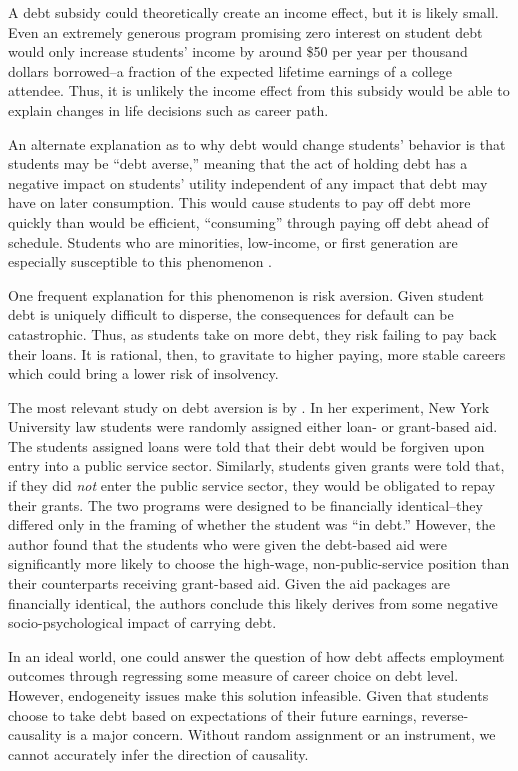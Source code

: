 \documentclass[12pt]{article}
\begin{document}
	A debt subsidy could theoretically create an income effect, but it is likely small. Even an extremely generous program promising zero interest on student debt would only increase students' income by around \$50 per year per thousand dollars borrowed--a fraction of the expected lifetime earnings of a college attendee. Thus, it is unlikely the income effect from this subsidy would be able to explain changes in life decisions such as career path.
	
	An alternate explanation as to why debt would change students' behavior is that students may be ``debt averse,'' meaning that the act of holding debt has a negative impact on students' utility independent of any impact that debt may have on later consumption. This would cause students to pay off debt more quickly than would be efficient, ``consuming'' through paying off debt ahead of schedule. Students who are minorities, low-income, or first generation are especially susceptible to this phenomenon \parencite{burdman2005, field2009, callender2005}. 
	
	One frequent explanation for this phenomenon is risk aversion. Given student debt is uniquely difficult to disperse, the consequences for default can be catastrophic. Thus, as students take on more debt, they risk failing to pay back their loans. It is rational, then, to gravitate to higher paying, more stable careers which could bring a lower risk of insolvency. 
	
	The most relevant study on debt aversion is by \textcite{field2009}. In her experiment, New York University law students were randomly assigned either loan- or grant-based aid. The students assigned loans were told that their debt would be forgiven upon entry into a public service sector. Similarly, students given grants were told that, if they did \emph{not} enter the public service sector, they would be obligated to repay their grants. The two programs were designed to be financially identical--they differed only in the framing of whether the student was ``in debt.'' However, the author found that the students who were given the debt-based aid were significantly more likely to choose the high-wage, non-public-service position than their counterparts receiving grant-based aid. Given the aid packages are financially identical, the authors conclude this likely derives from some negative socio-psychological impact of carrying debt.
	
	In an ideal world, one could answer the question of how debt affects employment outcomes through regressing some measure of career choice on debt level. However, endogeneity issues make this solution infeasible. Given that students choose to take debt based on expectations of their future earnings, reverse-causality is a major concern. Without random assignment or an instrument, we cannot accurately infer the direction of causality. 
	
\end{document}
